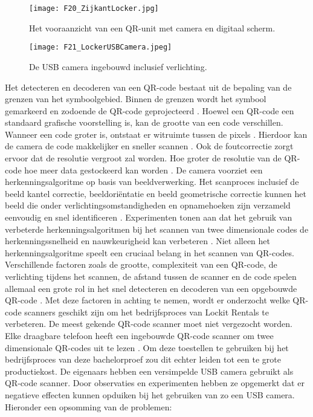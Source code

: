\begin{figure}[h]
    \centering
    \texttt{[image: F20\_ZijkantLocker.jpg]}
    \captionsetup{justification=centering, singlelinecheck=false}
    \caption{Het vooraanzicht van een QR-unit met camera en digitaal scherm.}
    \label{fig:zijkantLocker}
\end{figure}

\begin{figure}[h]
    \centering
    \texttt{[image: F21\_LockerUSBCamera.jpeg]}
    \captionsetup{justification=centering, singlelinecheck=false}
    \caption{De USB camera ingebouwd inclusief verlichting.}
    \label{fig:usbcameraLocker}
\end{figure}
\newpage
\newline
Het detecteren en decoderen van een QR-code bestaat uit de bepaling van de grenzen van het symboolgebied. Binnen de grenzen wordt het symbool gemarkeerd en zodoende de QR-code geprojecteerd \autocite{Belussi2011}. Hoewel een QR-code een standaard grafische voorstelling is, kan de grootte van een code verschillen. Wanneer een code groter is, ontstaat er witruimte tussen de pixels \autocite{Li2018}. Hierdoor kan de camera de code makkelijker en sneller scannen \autocite{Karrach2020}. Ook de foutcorrectie zorgt ervoor dat de resolutie vergroot zal worden. Hoe groter de resolutie van de QR-code hoe meer data gestockeerd kan worden \autocite{Chow2016}.
\newline
De camera voorziet een herkenningsalgoritme op basis van beeldverwerking. Het scanproces inclusief de beeld kantel correctie, beeldoriëntatie en beeld geometrische correctie kunnen het beeld die onder verlichtingsomstandigheden en opnamehoeken zijn verzameld eenvoudig en snel identificeren \autocite{Gu2011}.
Experimenten tonen aan dat het gebruik van verbeterde herkenningsalgoritmen bij het scannen van twee dimensionale codes de herkenningssnelheid en nauwkeurigheid kan verbeteren \autocite{Gu2011}.
\newline
Niet alleen het herkenningsalgoritme speelt een cruciaal belang in het scannen van QR-codes. Verschillende factoren zoals de grootte, complexiteit van een QR-code, de verlichting tijdens het scannen, de afstand tussen de scanner en de code spelen allemaal een grote rol in het snel detecteren en decoderen van een opgebouwde QR-code \autocite{Liu2008}. Met deze factoren in achting te nemen, wordt er onderzocht welke QR-code scanners geschikt zijn om het bedrijfsproces van Lockit Rentals te verbeteren.
\newline
De meest gekende QR-code scanner moet niet vergezocht worden. Elke draagbare telefoon heeft een ingebouwde QR-code scanner om twee dimensionale QR-codes uit te lezen \autocite{Abdulhakeem2014}. Om deze toestellen te gebruiken bij het bedrijfsproces van deze bachelorproef zou dit echter leiden tot een te grote productiekost. De eigenaars hebben een versimpelde USB camera gebruikt als QR-code scanner. Door observaties en experimenten hebben ze opgemerkt dat er negatieve effecten kunnen opduiken bij het gebruiken van zo een USB camera. Hieronder een opsomming van de problemen:

